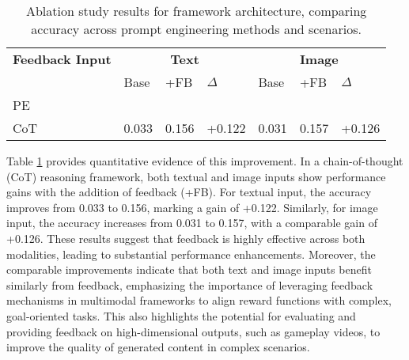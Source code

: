 \begin{table}[!h]
\caption{Ablation study results for framework architecture, comparing accuracy across prompt engineering methods and scenarios.}
\label{tab:feedback_input}
\begin{tabular}{p{1.5cm}|p{0.73cm}p{0.73cm}p{0.73cm}|p{0.73cm}p{0.73cm}p{0.73cm}}
\toprule
\textbf{Feedback Input} & \multicolumn{3}{c|}{\textbf{Text}} & \multicolumn{3}{c}{\textbf{Image}} \\
 & Base & +FB & $\Delta{}$ & Base & +FB & $\Delta{}$ \\
PE &  &  &  &  &  &  \\
\midrule
CoT & 0.033 & 0.156 & +0.122 & 0.031 & 0.157 & +0.126 \\
\bottomrule
\end{tabular}
\end{table}


Table \ref{tab:feedback_input} provides quantitative evidence of this improvement. In a chain-of-thought (CoT) reasoning framework, both textual and image inputs show performance gains with the addition of feedback (+FB). For textual input, the accuracy improves from 0.033 to 0.156, marking a gain of +0.122. Similarly, for image input, the accuracy increases from 0.031 to 0.157, with a comparable gain of +0.126. These results suggest that feedback is highly effective across both modalities, leading to substantial performance enhancements. Moreover, the comparable improvements indicate that both text and image inputs benefit similarly from feedback, emphasizing the importance of leveraging feedback mechanisms in multimodal frameworks to align reward functions with complex, goal-oriented tasks.
This also highlights the potential for evaluating and providing feedback on high-dimensional outputs, such as gameplay videos, to improve the quality of generated content in complex scenarios.